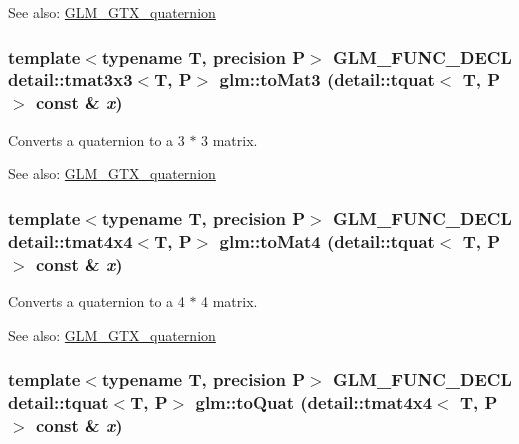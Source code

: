 \begin{Desc}
\item[See also:]\hyperlink{group__gtx__quaternion}{GLM\_\-GTX\_\-quaternion} \end{Desc}
\hypertarget{group__gtx__quaternion_gdff49fcff8a70186d2fe32117cb565e0}{
\subsubsection[toMat3]{\setlength{\rightskip}{0pt plus 5cm}template$<$typename T, precision P$>$ GLM\_\-FUNC\_\-DECL detail::tmat3x3$<$T, P$>$ glm::toMat3 (detail::tquat$<$ T, P $>$ const \& {\em x})}}
\label{group__gtx__quaternion_gdff49fcff8a70186d2fe32117cb565e0}


Converts a quaternion to a 3 $\ast$ 3 matrix.

\begin{Desc}
\item[See also:]\hyperlink{group__gtx__quaternion}{GLM\_\-GTX\_\-quaternion} \end{Desc}
\hypertarget{group__gtx__quaternion_g79cbd9f8eecf24a7b9f23e4de5fcec29}{
\subsubsection[toMat4]{\setlength{\rightskip}{0pt plus 5cm}template$<$typename T, precision P$>$ GLM\_\-FUNC\_\-DECL detail::tmat4x4$<$T, P$>$ glm::toMat4 (detail::tquat$<$ T, P $>$ const \& {\em x})}}
\label{group__gtx__quaternion_g79cbd9f8eecf24a7b9f23e4de5fcec29}


Converts a quaternion to a 4 $\ast$ 4 matrix.

\begin{Desc}
\item[See also:]\hyperlink{group__gtx__quaternion}{GLM\_\-GTX\_\-quaternion} \end{Desc}
\hypertarget{group__gtx__quaternion_g1d496c7c0d0b1a2edc5bb4c2ffcbc6e7}{
\subsubsection[toQuat]{\setlength{\rightskip}{0pt plus 5cm}template$<$typename T, precision P$>$ GLM\_\-FUNC\_\-DECL detail::tquat$<$T, P$>$ glm::toQuat (detail::tmat4x4$<$ T, P $>$ const \& {\em x})}}
\label{group__gtx__quaternion_g1d496c7c0d0b1a2edc5bb4c2ffcbc6e7}


